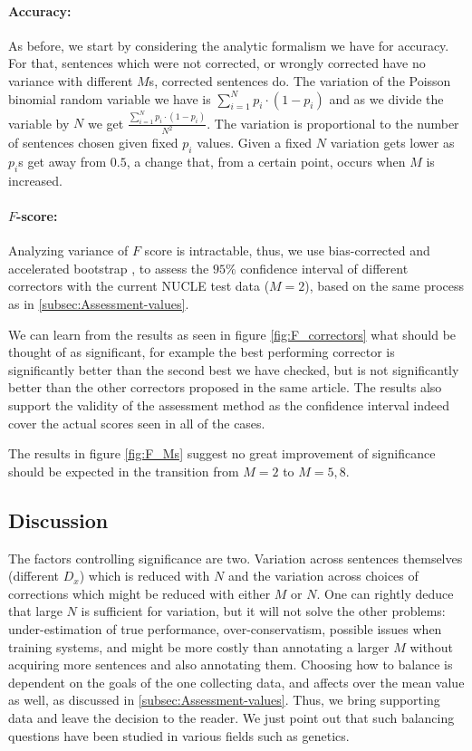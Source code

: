 \documentclass[letter,11pt]{article}
\begin{document}
		
		\paragraph{Accuracy:} As before, we start by considering the analytic formalism we have for accuracy. For that, sentences which were not corrected, or wrongly corrected have no variance with different $M$s, corrected sentences do. The variation of the Poisson binomial random variable we have is $\sum_{i=1}^{N}p_i\cdot\left(1-p_i\right)$ and as we divide the variable by $N$ we get $\frac{\sum_{i=1}^{N}p_i\cdot\left(1-p_i\right)}{N^2}$. 
		The variation is proportional to the number of sentences chosen given fixed $p_i$ values. Given a fixed $N$ variation gets lower as $p_i$s get away from $0.5$, a change that, from a certain point, occurs when $M$ is increased.
		
		\paragraph{$F$-score:} Analyzing variance of $F$ score is intractable\cite{yeh2000more}, thus, we use bias-corrected and accelerated bootstrap \cite{efron1987better}, to assess the $95\%$ confidence interval of different correctors with the current NUCLE test data ($M=2$), based on the same process as in \ref{subsec:Assessment-values}.
		
		We can learn from the results as seen in figure \ref{fig:F_correctors} what should be thought of as significant, for example the best performing corrector is significantly better than the second best we have checked, but is not significantly better than the other correctors proposed in the same article\cite{rozovskaya2016grammatical}. The results also  support the validity of the assessment method as the confidence interval indeed cover the actual scores seen in all of the cases. 
		
		The results in figure \ref{fig:F_Ms} suggest no great improvement of significance should be expected in the transition from $M=2$ to $M=5,8$.
		
		\subsection{Discussion}
		
		The factors controlling significance are two. Variation across sentences themselves (different $D_x$) which is reduced with $N$ and the variation across choices of corrections which might be reduced with either $M$ or $N$. One can rightly deduce that large $N$ is sufficient for variation, but it will not solve the other problems: under-estimation of true performance,
		over-conservatism, possible issues when training systems, and might be more costly than annotating a larger $M$ without acquiring more sentences and also annotating them.
		Choosing how to balance is dependent on the goals of the one collecting data, and affects over the mean value as well, as discussed in \ref{subsec:Assessment-values}. Thus, we bring supporting data and leave the decision to the reader. We just point out that such balancing questions have been studied in various fields such as genetics\cite{ionita2010optimal}.
		
\end{document}

